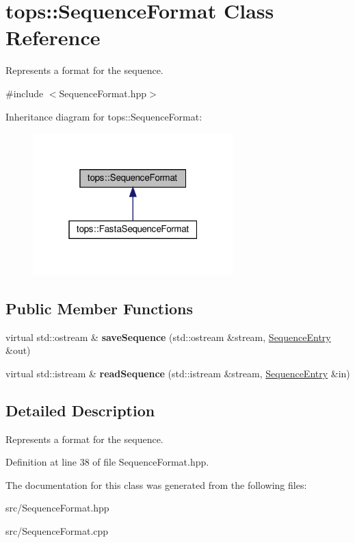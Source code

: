 \hypertarget{classtops_1_1SequenceFormat}{}\section{tops\+:\+:Sequence\+Format Class Reference}
\label{classtops_1_1SequenceFormat}


Represents a format for the sequence.  




{\ttfamily \#include $<$Sequence\+Format.\+hpp$>$}



Inheritance diagram for tops\+:\+:Sequence\+Format\+:
\nopagebreak
\begin{figure}[H]
\begin{center}
\leavevmode
\includegraphics[width=220pt]{classtops_1_1SequenceFormat__inherit__graph}
\end{center}
\end{figure}
\subsection*{Public Member Functions}
\begin{DoxyCompactItemize}
\item 
\mbox{\label{classtops_1_1SequenceFormat_a02c3efa76c3f4dc3281fd84cceee7622}} 
virtual std\+::ostream \& {\bfseries save\+Sequence} (std\+::ostream \&stream, \hyperlink{classtops_1_1SequenceEntry}{Sequence\+Entry} \&out)
\item 
\mbox{\label{classtops_1_1SequenceFormat_ade21b31eb526ee1843a5dd3ae823c5ba}} 
virtual std\+::istream \& {\bfseries read\+Sequence} (std\+::istream \&stream, \hyperlink{classtops_1_1SequenceEntry}{Sequence\+Entry} \&in)
\end{DoxyCompactItemize}


\subsection{Detailed Description}
Represents a format for the sequence. 

Definition at line 38 of file Sequence\+Format.\+hpp.



The documentation for this class was generated from the following files\+:\begin{DoxyCompactItemize}
\item 
src/Sequence\+Format.\+hpp\item 
src/Sequence\+Format.\+cpp\end{DoxyCompactItemize}

